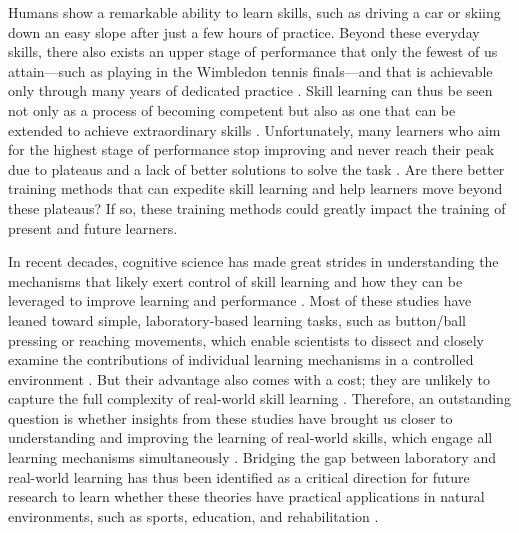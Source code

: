 \newcommand{\RNum}[1]{\uppercase\expandafter{\romannumeral #1\relax}}
Humans show a remarkable ability to learn skills, such as driving a car or skiing down an easy slope after just a few hours of practice. Beyond these everyday skills, there also exists an upper stage of performance that only the fewest of us attain—such as playing in the Wimbledon tennis finals—and that is achievable only through many years of dedicated practice \cite{hodges_predicting_2004, ericsson_role_1993, vaeyens_talent_2009}. Skill learning can thus be seen not only as a process of becoming competent but also as one that can be extended to achieve extraordinary skills \cite{ericsson_development_2003, ericsson_scientific_1998}. 
Unfortunately, many learners who aim for the highest stage of performance stop improving and never reach their peak due to plateaus and a lack of better solutions to solve the task \cite{thorndike_educational_1913, grayloooooong,grayshort,ericsson_scientific_1998, ericsson_development_2003}. Are there better training methods that can expedite skill learning and help learners move beyond these plateaus? If so, these training methods could greatly impact the training of present and future learners. 

In recent decades, cognitive science has made great strides in understanding the mechanisms that likely exert control of skill learning and how they can be leveraged to improve learning and performance \cite{wolpert_principles_2011, makino_circuit_2016, spampinato_multiple_2021, krakauer_motor_2019, haith_model-based_2013, huang_rethinking_2011, shmuelof_are_2011, doya_complementary_2000}. Most of these studies have leaned toward simple, laboratory-based learning tasks\cite{krakauer_motor_2019, du_relationship_2022}, such as button/ball pressing \cite{hardwick_time-dependent_2019, vassiliadis_reward_2021} or reaching movements\cite{shadmehr_adaptive_1994, krakauer_learning_2000},  which enable scientists to dissect and closely examine the contributions of individual learning mechanisms in a controlled environment \cite{spampinato_multiple_2021}. But their advantage also comes with a cost; they are unlikely to capture the full complexity of real-world skill learning \cite{krakauer_motor_2019, mangalam_investigating_2023, du_relationship_2022, chen_effects_2018, wolpert_principles_2011, gallivan_decision-making_2018, iyer_probing_2020, ingram_naturalistic_2011}. Therefore, an outstanding question is whether insights from these studies have brought us closer to understanding and improving the learning of real-world skills, which engage all learning mechanisms simultaneously \cite{spampinato_multiple_2021}. Bridging the gap between laboratory and real-world learning has thus been identified as a critical direction for future research to learn whether these theories have practical applications in natural environments, such as sports, education, and rehabilitation \cite{du_relationship_2022, wolpert_motor_2010, yarrow_inside_2009, haar_motor_2020, ingram_naturalistic_2011}.

